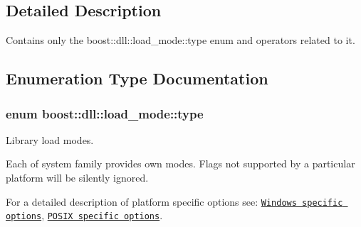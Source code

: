 \subsection{Detailed Description}
Contains only the boost\+::dll\+::load\+\_\+mode\+::type enum and operators related to it. 



\subsection{Enumeration Type Documentation}
\subsubsection[{\texorpdfstring{type}{type}}]{\setlength{\rightskip}{0pt plus 5cm}enum {\bf boost\+::dll\+::load\+\_\+mode\+::type}}\hypertarget{a00729_file_a1918a602801479bc0bade54ff5665129}{}\label{a00729_file_a1918a602801479bc0bade54ff5665129}
Library load modes.

Each of system family provides own modes. Flags not supported by a particular platform will be silently ignored.

For a detailed description of platform specific options see\+: \href{http://msdn.microsoft.com/en-us/library/windows/desktop/ms684179(v=vs.85).aspx}{\tt Windows specific options}, \href{http://pubs.opengroup.org/onlinepubs/000095399/functions/dlopen.html}{\tt P\+O\+S\+IX specific options}. 